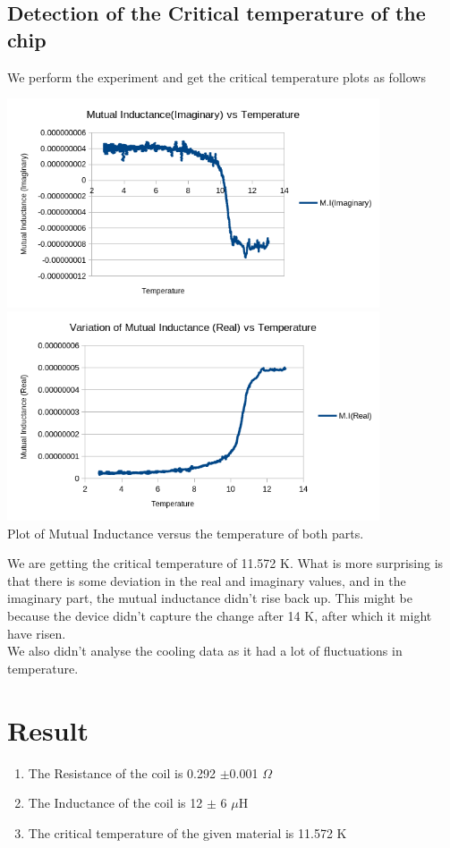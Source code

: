 \documentclass[]{report}[12 pt]
\begin{document}
\subsection*{Detection of the Critical temperature of the chip}
We perform the experiment and get the critical temperature plots as follows
\begin{center}
	\includegraphics[width=11cm]{plot1.png}
	\includegraphics[width=11cm]{plot2.png}\\
	Plot of Mutual Inductance versus the temperature of both parts.
\end{center}
	We are getting the critical temperature of 11.572 K. What is more surprising is that there is some deviation in the real and imaginary values, and in the imaginary part, the mutual inductance didn't rise back up. This might be because the device didn't capture the  change after 14 K, after which it might have risen.
	\\We also didn't analyse the cooling data as it had a lot of fluctuations in temperature. 
	\section*{Result}
	\begin{enumerate}
		\item The Resistance of the coil is 0.292 $\pm$0.001 $\Omega$
		\item The Inductance of the coil is 12 $\pm$ 6 $\mu$H
		\item The critical temperature of the given material is 11.572 K
	\end{enumerate}
\end{document}
